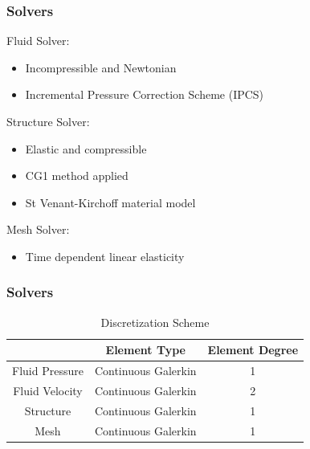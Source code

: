 \documentclass{beamer}
\begin{document}
\begin{frame}[fragile]
\frametitle{Solvers}

Fluid Solver: 
\begin{itemize}
\item Incompressible and Newtonian
\item Incremental Pressure Correction Scheme (IPCS)
\end{itemize}

Structure Solver: 
\begin{itemize}
\item Elastic and compressible %
\item CG1 method applied
\item St Venant-Kirchoff material model
\end{itemize}
Mesh Solver: 
\begin{itemize}
\item Time dependent linear elasticity
\end{itemize}
\end{frame}

\begin{frame}
\frametitle{Solvers}

\FloatBarrier
\begin{table}[htbp]
\centering
\caption{Discretization Scheme}
\begin{tabular}{ccc}
\toprule
 & Element Type & Element Degree \\
\midrule
Fluid Pressure & Continuous Galerkin & 1  \\
Fluid Velocity  & Continuous Galerkin & 2  \\
Structure & Continuous Galerkin & 1  \\
Mesh & Continuous Galerkin & 1 \\
\bottomrule
\end{tabular}%
\label{tab:Discretization}%
\end{table}%
\FloatBarrier


\end{frame}
\end{document}

